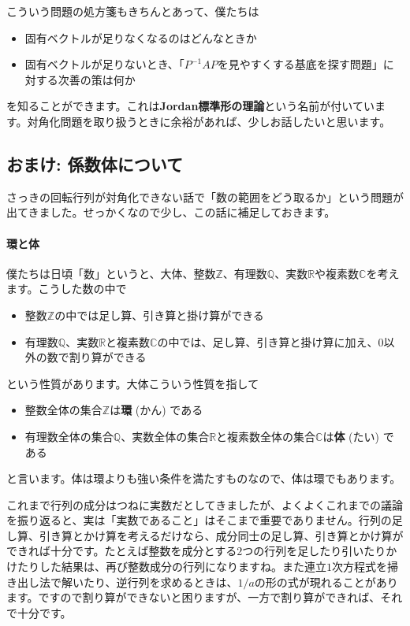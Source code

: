 こういう問題の処方箋もきちんとあって、僕たちは
\begin{itemize}
\item 固有ベクトルが足りなくなるのはどんなときか
\item 固有ベクトルが足りないとき、「$P^{-1} A P$を見やすくする基底を探す問題」に対する次善の策は何か
\end{itemize}
を知ることができます。これは\textbf{Jordan標準形の理論}という名前が付いています。対角化問題を取り扱うときに余裕があれば、少しお話したいと思います。

\subsection{おまけ: 係数体について}

さっきの回転行列が対角化できない話で「数の範囲をどう取るか」という問題が出てきました。せっかくなので少し、この話に補足しておきます。

\paragraph{環と体}

僕たちは日頃「数」というと、大体、整数$\mathbb{Z}$、有理数$\mathbb{Q}$、実数$\mathbb{R}$や複素数$\mathbb{C}$を考えます。こうした数の中で
\begin{itemize}
\item 整数$\mathbb{Z}$の中では足し算、引き算と掛け算ができる
\item 有理数$\mathbb{Q}$、実数$\mathbb{R}$と複素数$\mathbb{C}$の中では、足し算、引き算と掛け算に加え、$0$以外の数で割り算ができる
\end{itemize}
という性質があります。大体こういう性質を指して
\begin{itemize}
\item 整数全体の集合$\mathbb{Z}$は\textbf{環} (かん) である
\item 有理数全体の集合$\mathbb{Q}$、実数全体の集合$\mathbb{R}$と複素数全体の集合$\mathbb{C}$は\textbf{体} (たい) である
\end{itemize}
と言います。体は環よりも強い条件を満たすものなので、体は環でもあります。

これまで行列の成分はつねに実数だとしてきましたが、よくよくこれまでの議論を振り返ると、実は「実数であること」はそこまで重要でありません。行列の足し算、引き算とかけ算を考えるだけなら、成分同士の足し算、引き算とかけ算ができれば十分です。たとえば整数を成分とする$2$つの行列を足したり引いたりかけたりした結果は、再び整数成分の行列になりますね。また連立$1$次方程式を掃き出し法で解いたり、逆行列を求めるときは、$1/a$の形の式が現れることがあります。ですので割り算ができないと困りますが、一方で割り算ができれば、それで十分です。

